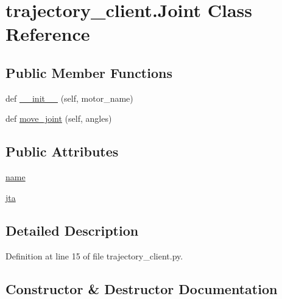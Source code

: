 \hypertarget{classtrajectory__client_1_1_joint}{}\section{trajectory\+\_\+client.\+Joint Class Reference}
\label{classtrajectory__client_1_1_joint}
\subsection*{Public Member Functions}
\begin{DoxyCompactItemize}
\item 
def \hyperlink{classtrajectory__client_1_1_joint_a9d389b66ef367799eb9141b9b107dc9f}{\+\_\+\+\_\+init\+\_\+\+\_\+} (self, motor\+\_\+name)
\item 
def \hyperlink{classtrajectory__client_1_1_joint_a0d8109140ca6092a4fa5e92fe75aaeb9}{move\+\_\+joint} (self, angles)
\end{DoxyCompactItemize}
\subsection*{Public Attributes}
\begin{DoxyCompactItemize}
\item 
\hyperlink{classtrajectory__client_1_1_joint_a1b9ed73437add9c5b106edf224295b7e}{name}
\item 
\hyperlink{classtrajectory__client_1_1_joint_a749e573716c2744874918f2e7b00c33a}{jta}
\end{DoxyCompactItemize}


\subsection{Detailed Description}


Definition at line 15 of file trajectory\+\_\+client.\+py.



\subsection{Constructor \& Destructor Documentation}
\mbox{\label{classtrajectory__client_1_1_joint_a9d389b66ef367799eb9141b9b107dc9f}} 
